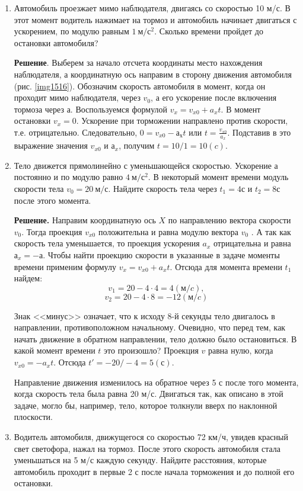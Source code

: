 \documentclass[a5paper, 10pt]{diss_4}
\renewcommand{\'}{\,'}
\begin{document}
\begin{enumerate}

\item { Автомобиль проезжает мимо наблюдателя, двигаясь со скоростью 10 м/с. В этот
момент водитель нажимает на тормоз и автомобиль начинает двигаться с
ускорением, по модулю равным $1\ м/с^2$. Сколько времени пройдет до остановки
автомобиля?

  \textbf{Решение}. Выберем за начало отсчета координаты место нахождения
наблюдателя, а координатную ось направим в сторону движения автомобиля (рис.
\ref{img1516}). Обозначим скорость автомобиля в момент, когда он проходит мимо
наблюдателя, через $v_0$, а его ускорение после включения тормоза через $а$.
Воспользуемся формулой $v_x=v_{x0}+a_xt$. В момент остановки $v_x= 0$.
Ускорение при торможении направлено против скорости, т.е. отрицательно.
Следовательно, $0 = v_{x0}-а_{х}t $ или $t = \frac{v_{x0}}{a_x}$. Подставив в
это выражение значения $v_{x0}$ и $а_x$, получим $t = 10/1=10(c)$.
}

\item {
  Тело движется прямолинейно с уменьшающейся скоростью. Ускорение $а$ постоянно
и по модулю равно $4\ м/с^2$. В некоторый момент времени модуль скорости тела
$v_0 =20\ м/с$. Найдите скорость тела через $t_1=4с$ и $t_2=8с$ после этого
момента.

\textbf{Решение.} Направим координатную ось $X$ по направлению вектора скорости
$v_0$. Тогда проекция $v_{x0}$ положительна и равна модулю вектора $v_0$ . А так как
скорость тела уменьшается, то проекция ускорения $a_x$ отрицательна и равна $а_x=-а$.
Чтобы найти проекцию скорости в указанные в задаче моменты времени
применим формулу $v_x=v_{x0}+a_xt$. Отсюда для момента времени $t_1$ найдем:
\[v_1=20-4\cdot 4 = 4(м/c),\]
\[v_2=20-4\cdot 8 = -12(м/c)\]

  Знак <<минус>> означает, что к исходу 8-й секунды тело двигалось в
направлении, противоположном начальному. Очевидно, что перед тем, как начать
движение в обратном направлении, тело должно было остановиться. В какой
момент времени $t$ это произошло? Проекция $v$ равна нулю, когда
$v_{x0}=-a_{x}t$. Отсюда $t'=-20/-4=5(с)$.

 Направление движения изменилось на обратное через 5 с после того момента, когда
скорость тела была равна 20 м/с. Двигаться так, как описано в этой задаче,
могло бы, например, тело, которое толкнули вверх по наклонной плоскости.
}
\item {
 Водитель автомобиля, движущегося со скоростью 72 км/ч, увидев красный свет
светофора, нажал на тормоз. После этого скорость автомобиля стала уменьшаться
на 5 м/с каждую секунду. Найдите расстояния, которые автомобиль проходит в
первые 2 с после начала торможения и до полной его остановки.

}
\end{enumerate}
\end{document}
